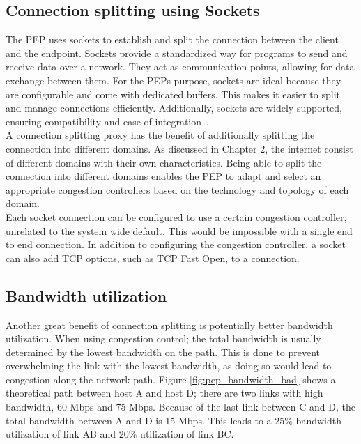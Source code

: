 \documentclass[a4paper,english, 12pt]{report}
\begin{document}
\subsection{Connection splitting using Sockets}%
The PEP uses sockets to establish and split the connection between the client and the endpoint. Sockets provide a standardized way for programs to send and receive data over a network. They act as communication points, allowing for data exchange between them. For the PEPs purpose, sockets are ideal because they are configurable and come with dedicated buffers. This makes it easier to split and manage connections efficiently. Additionally, sockets are widely supported, ensuring compatibility and ease of integration~\cite{8999401}.\\

A connection splitting proxy has the benefit of additionally splitting the connection into different domains. As discussed in Chapter 2, the internet consist of different domains with their own characteristics. Being able to split the connection into different domains enables the PEP to adapt and select an appropriate congestion controllers based on the technology and topology of each domain.\\

Each socket connection can be configured to use a certain congestion controller, unrelated to the system wide default. This would be impossible with a single end to end connection. In addition to configuring the congestion controller, a socket can also add TCP options, such as TCP Fast Open, to a connection.

\subsection{Bandwidth utilization}
Another great benefit of connection splitting is potentially better bandwidth utilization. When using congestion control; the total bandwidth is usually determined by the lowest bandwidth on the path\cite{top_down}. This is done to prevent overwhelming the link with the lowest bandwidth, as doing so would lead to congestion along the network path. Figure \ref{fig:pep_bandwidth_bad} shows a theoretical path between host A and host D; there are two links with high bandwidth, 60 Mbps and 75 Mbps. Because of the last link between C and D, the total bandwidth between A and D is 15 Mbps. This leads to a 25\% bandwidth utilization of link AB and 20\% utilization of link BC.\\
\end{document}
